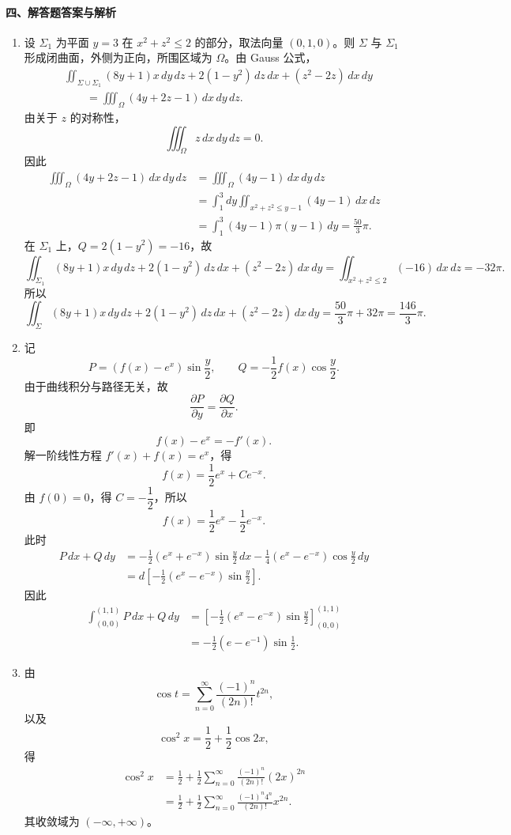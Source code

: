 \paragraph*{四、解答题答案与解析}
\begin{enumerate}
  \item 设 $\Sigma_1$ 为平面 $y=3$ 在 $x^2+z^2\le 2$ 的部分，取法向量 $(0,1,0)$。则 $\Sigma$ 与 $\Sigma_1$ 形成闭曲面，外侧为正向，所围区域为 $\Omega$。由 Gauss 公式，
  \begin{align*}
    &\iint_{\Sigma\cup\Sigma_1}(8y+1)x\,dy\,dz+2(1-y^2)\,dz\,dx+(z^2-2z)\,dx\,dy\\
    &\qquad
    =\iiint_\Omega (4y+2z-1)\,dx\,dy\,dz.
  \end{align*}
  由关于 $z$ 的对称性，
  \[
    \iiint_\Omega z\,dx\,dy\,dz=0.
  \]
  因此
  \begin{align*}
    \iiint_\Omega (4y+2z-1)\,dx\,dy\,dz
    &=\iiint_\Omega (4y-1)\,dx\,dy\,dz\\
    &=\int_1^3dy\iint_{x^2+z^2\le y-1}(4y-1)\,dx\,dz\\
    &=\int_1^3(4y-1)\pi(y-1)\,dy
    =\frac{50}{3}\pi.
  \end{align*}
  在 $\Sigma_1$ 上，$Q=2(1-y^2)=-16$，故
  \[
    \iint_{\Sigma_1}(8y+1)x\,dy\,dz+2(1-y^2)\,dz\,dx+(z^2-2z)\,dx\,dy
    =\iint_{x^2+z^2\le2}(-16)\,dx\,dz=-32\pi.
  \]
  所以
  \[
    \iint_\Sigma (8y+1)x\,dy\,dz+2(1-y^2)\,dz\,dx+(z^2-2z)\,dx\,dy
    =\frac{50}{3}\pi+32\pi
    =\frac{146}{3}\pi.
  \]

  \item 记
  \[
    P=(f(x)-e^x)\sin\frac{y}{2},\qquad
    Q=-\frac12f(x)\cos\frac{y}{2}.
  \]
  由于曲线积分与路径无关，故
  \[
    \frac{\partial P}{\partial y}=\frac{\partial Q}{\partial x}.
  \]
  即
  \[
    f(x)-e^x=-f'(x).
  \]
  解一阶线性方程 $f'(x)+f(x)=e^x$，得
  \[
    f(x)=\frac12e^x+Ce^{-x}.
  \]
  由 $f(0)=0$，得 $C=-\dfrac12$，所以
  \[
    f(x)=\frac12e^x-\frac12e^{-x}.
  \]
  此时
  \begin{align*}
    P\,dx+Q\,dy
    &=-\frac12(e^x+e^{-x})\sin\frac{y}{2}\,dx
      -\frac14(e^x-e^{-x})\cos\frac{y}{2}\,dy\\
    &=d\left[-\frac12(e^x-e^{-x})\sin\frac{y}{2}\right].
  \end{align*}
  因此
  \begin{align*}
    \int_{(0,0)}^{(1,1)}P\,dx+Q\,dy
    &=
    \left[-\frac12(e^x-e^{-x})\sin\frac{y}{2}\right]_{(0,0)}^{(1,1)}\\
    &=-\frac12(e-e^{-1})\sin\frac12.
  \end{align*}

  \item 由
  \[
    \cos t=\sum_{n=0}^{\infty}\frac{(-1)^n}{(2n)!}t^{2n},
  \]
  以及
  \[
    \cos^2x=\frac12+\frac12\cos2x,
  \]
  得
  \begin{align*}
    \cos^2x
    &=\frac12+\frac12\sum_{n=0}^{\infty}\frac{(-1)^n}{(2n)!}(2x)^{2n}\\
    &=\frac12+\frac12\sum_{n=0}^{\infty}\frac{(-1)^n4^n}{(2n)!}x^{2n}.
  \end{align*}
  其收敛域为 $(-\infty,+\infty)$。
\end{enumerate}

